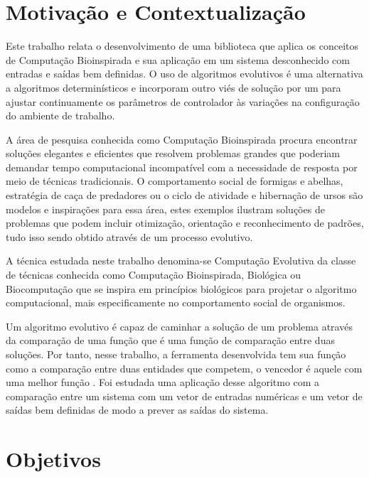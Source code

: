 \section{Motivação e Contextualização}

\newcommand\SE{\sigla{SE}{Sistema Evolutivo}\xspace}

Este trabalho relata o desenvolvimento de uma biblioteca que aplica os conceitos de Computação Bioinspirada e sua aplicação em um sistema desconhecido com entradas e saídas bem definidas. O uso de algoritmos evolutivos é uma alternativa a algoritmos determinísticos  e incorporam outro viés de solução por um \SE\cite{Layzell1999} para ajustar continuamente os parâmetros de controlador às variações na configuração do ambiente de trabalho.

A área de pesquisa conhecida como Computação Bioinspirada procura encontrar soluções elegantes e eficientes que resolvem problemas grandes que poderiam demandar tempo computacional incompatível com a necessidade de resposta por meio de técnicas tradicionais. O comportamento social de formigas e abelhas, estratégia de caça de predadores ou o ciclo de atividade e hibernação de ursos são modelos e inspirações para essa área, estes exemplos ilustram soluções de problemas que podem incluir otimização, orientação e reconhecimento de padrões, tudo isso sendo obtido através de um processo evolutivo.\cite{Simoes2000}

A técnica estudada neste trabalho denomina-se Computação Evolutiva da classe de técnicas conhecida como Computação Bioinspirada, Biológica ou Biocomputação que se inspira em princípios biológicos para projetar o algoritmo computacional, mais especificamente no comportamento social de organismos.

Um algoritmo evolutivo é capaz de caminhar a solução de um problema através da comparação de uma função \fitness que é uma função de comparação entre duas soluções. Por tanto, nesse trabalho, a ferramenta desenvolvida tem sua função \fitness como a comparação entre duas entidades que competem, o vencedor é aquele com uma melhor função \fitness. Foi estudada uma aplicação desse algoritmo com a comparação entre um sistema com um vetor de entradas numéricas e um vetor de saídas bem definidas de modo a prever as saídas do sistema.

\section{Objetivos}

